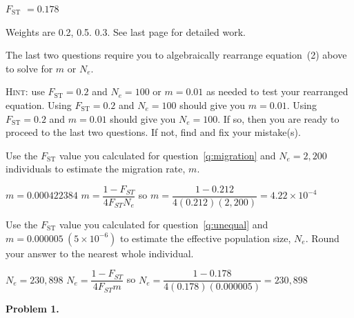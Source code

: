 \documentclass[12pt, addpoints, hidelinks]{exam}
\newcommand{\fst}{$F_{\mathrm{ST}}$}
\begin{document}
\begin{questions}
\begin{multicols}{2}
\columnbreak

\ifprintanswers 

\fst{} $= 0.178$ 

Weights are 0.2, 0.5. 0.3. See last page for detailed work.

\else \phantom{\fst{} $= 0.178$} \fi

\end{multicols}
	
\newpage

The last two questions require you to algebraically rearrange equation~(2) above to solve for $m$ or $N_e$.

\textsc{Hint:} use $F_\mathrm{ST} = 0.2$ and $N_e = 100$ or $m = 0.01$ as needed to test your rearranged equation. Using $F_\mathrm{ST} = 0.2$ and $N_e = 100$ should give you $m = 0.01$. Using $F_\mathrm{ST} = 0.2$ and $m = 0.01$ should give you $N_e = 100$. If so, then you are ready to proceed to the last two questions. If not, find and fix your mistake(s).

\question[4]
Use the \fst{} value you calculated for question~\ref{q:migration} and $N_e = 2,200$ individuals to estimate the migration rate, $m$. 

\ifprintanswers 
	$m = 0.000422384$  \hfill $m = \dfrac{1-F_{ST}}{4F_{ST}N_e}$ \hspace{1em} so \hspace{1em} $m = \dfrac{1 - 0.212}{4(0.212)(2,200)} = 4.22 \times 10^{-4}$
	
	\vspace{2\baselineskip} 
\else 
	\vspace{3\baselineskip}
\fi

\question[4]
Use the \fst{} value you calculated for question~\ref{q:unequal} and $m = 0.000005\ (5\times 10^{-6})$ to estimate the effective population size, $N_e$. Round your answer to the nearest whole individual.

\ifprintanswers 
	$N_e = 230,898$ \hfill $N_e = \dfrac{1-F_{ST}}{4F_{ST}m}$ \quad so \quad $N_e = \dfrac{1 - 0.178}{4(0.178)(0.000005)} = 230,898$

	
	\vspace{\baselineskip}
\else 
	\vspace{2\baselineskip} 
\fi

\ifprintanswers

\newpage

\begin{multicols}{2}

\textbf{Problem 1.}


\end{multicols}
\end{questions}
\end{document}
